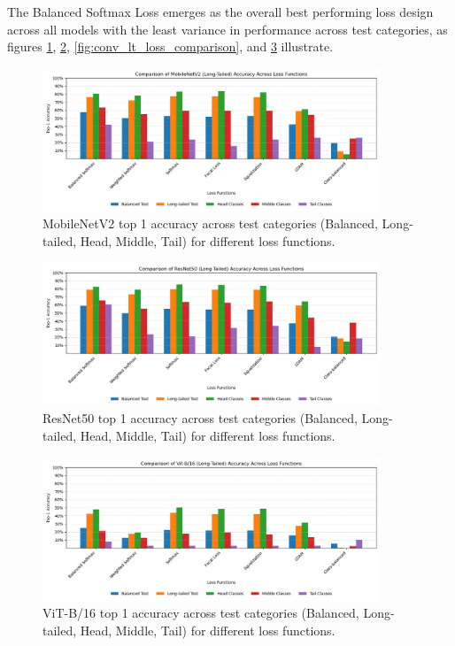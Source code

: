 The Balanced Softmax Loss emerges as the overall best performing loss design across all models with the least variance in performance across test categories, as figures \ref{fig:mobilenet_lt_loss_comparison}, \ref{fig:resnet_lt_loss_comparison}, \ref{fig:conv_lt_loss_comparison}, and \ref{fig:vit_lt_loss_comparison} illustrate. 



\begin{figure}[H]
    \centering
    \includegraphics[width=0.9\textwidth]{Images/Plots/mobilenet_lt_loss_comparison.png}
    \caption{MobileNetV2 top 1 accuracy across test categories (Balanced, Long-tailed, Head, Middle, Tail) for different loss functions.}
    \label{fig:mobilenet_lt_loss_comparison}
\end{figure}

\begin{figure}[H]
    \centering
    \includegraphics[width=0.9\textwidth]{Images/Plots/resnet_lt_loss_comparison.png}
    \caption{ResNet50 top 1 accuracy across test categories (Balanced, Long-tailed, Head, Middle, Tail) for different loss functions.}
    \label{fig:resnet_lt_loss_comparison}
\end{figure}

\begin{figure}[H]
    \centering
    \includegraphics[width=0.9\textwidth]{Images/Plots/vit_lt_loss_comparison.png}
    \caption{ViT-B/16 top 1 accuracy across test categories (Balanced, Long-tailed, Head, Middle, Tail) for different loss functions.}
    \label{fig:vit_lt_loss_comparison}
\end{figure}

